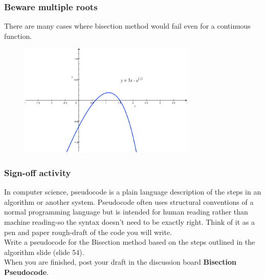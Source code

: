 \documentclass{if-beamer}
\begin{document}
\begin{frame}
\frametitle{Beware multiple roots}
There are many cases where bisection method would fail even for a continuous
function.
\begin{figure}
\center
\includegraphics[width=0.75\textwidth]{figures/doubleroot.png}
\end{figure}
\end{frame}

\begin{frame}
\frametitle{Sign-off activity}
In computer science, pseudocode is a plain language description of the steps in an algorithm or another system. Pseudocode often uses structural conventions of a normal programming language but is intended for human reading rather than machine reading-so the syntax doesn't need to be exactly right. Think of it as a pen and paper rough-draft of the code you will write. \\\vspace{10pt} 
Write a pseudocode for the Bisection method based on the steps outlined in the algorithm slide (slide 54).
\\\vspace{10pt} 
When you are finished, post your draft in the discussion board \textbf{Bisection Pseudocode}. 
\end{frame}
\end{document}
